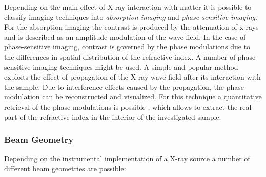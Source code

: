Depending on the main effect of X-ray interaction with matter it is possible to classify  imaging techniques into \textit{absorption imaging} and \textit{phase-sensitive imaging}.
For the absorption imaging the contrast is produced by the attenuation of x-rays and is described as an amplitude modulation of the wave-field. In the case of  phase-sensitive imaging, contrast is governed by the
phase modulations due to the differences in spatial distribution of the refractive index.    
A number of phase sensitive imaging techniques might be used. A simple and popular method exploits the effect of propagation of the X-ray wave-field after its  interaction with the sample. Due to interference effects caused by the propagation,  the phase modulation can be reconstructed and visualized. For this technique a quantitative retrieval of the phase modulations is possible \cite{Cloetens99ab}, which allows to extract the real part of the refractive index in the interior of the investigated sample. 


%
%


\subsubsection*{Beam Geometry}
Depending on the instrumental implementation of a X-ray source a number of different beam geometries are possible:

